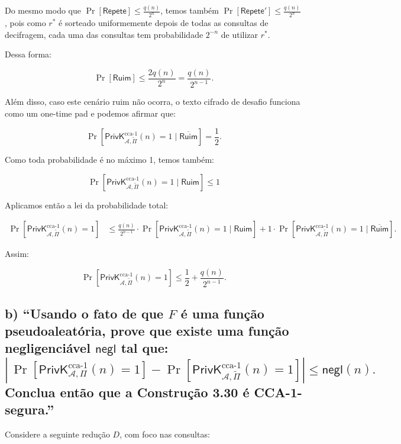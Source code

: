 \documentclass[11pt,a4paper]{article}
\newcommand{\negl}{\mathsf{negl}}
\newcommand{\Ruim}{\mathsf{Ruim}}
\newcommand{\Repete}{\mathsf{Repete}}
\newcommand{\PrivKccaI}[3]{\mathsf{PrivK}^{\mathrm{cca}\text{-}1}_{#1,#2}(#3)}
\begin{document}
    Do mesmo modo que $\Pr[\Repete] \le \frac{q(n)}{2^n}$, temos também $\Pr[\Repete'] \le \frac{q(n)}{2^n}$, pois como
    $r^{*}$ é sorteado uniformemente depois de todas as consultas de decifragem, cada uma das consultas tem probabilidade $2^{-n}$
    de utilizar $r^{*}$.

    Dessa forma:

    \[
        \Pr[\Ruim] \le \frac{2q(n)}{2^n} = \frac{q(n)}{2^{n-1}}.
    \]

    Além disso, caso este cenário ruim não ocorra, o texto cifrado de
    desafio funciona como um one-time pad e podemos afirmar que:

    \[
        \Pr\!\left[\PrivKccaI{\mathcal{A}}{\tilde{\Pi}}{n} = 1 \mid \overline{\Ruim}\right]
        = \frac{1}{2}.
    \]

    Como toda probabilidade é no máximo 1, temos também:

    \[
        \Pr\!\left[\PrivKccaI{\mathcal{A}}{\tilde{\Pi}}{n} = 1 \mid \Ruim\right] \le 1
    \]

    Aplicamos então a lei da probabilidade total:

    \begin{align*}
        \Pr\!\left[\PrivKccaI{\mathcal{A}}{\tilde{\Pi}}{n} = 1\right]
        &\le \frac{q(n)}{2^{n-1}} \cdot
        \Pr\!\left[\PrivKccaI{\mathcal{A}}{\tilde{\Pi}}{n} = 1 \mid \Ruim\right] + 1 \cdot
        \Pr\!\left[\PrivKccaI{\mathcal{A}}{\tilde{\Pi}}{n} = 1 \mid \overline{\Ruim}\right].
    \end{align*}

    Assim:

    \[
        \Pr\!\left[\PrivKccaI{\mathcal{A}}{\tilde{\Pi}}{n} = 1\right]
        \le \frac{1}{2} + \frac{q(n)}{2^{n-1}}.
    \]

    \subsection*{b) ``Usando o fato de que $F$ é uma função pseudoaleatória, prove que existe uma função
    negligenciável $\negl$ tal que:
        \[
            \left|\,\Pr\!\left[\PrivKccaI{\mathcal{A}}{\Pi}{n} = 1\right]
                - \Pr\!\left[\PrivKccaI{\mathcal{A}}{\tilde{\Pi}}{n} = 1\right]\right|
            \le \negl(n).
        \]
        Conclua então que a Construção 3.30 é CCA-1-segura.''}

    Considere a seguinte redução $D$, com foco nas consultas:
\end{document}
